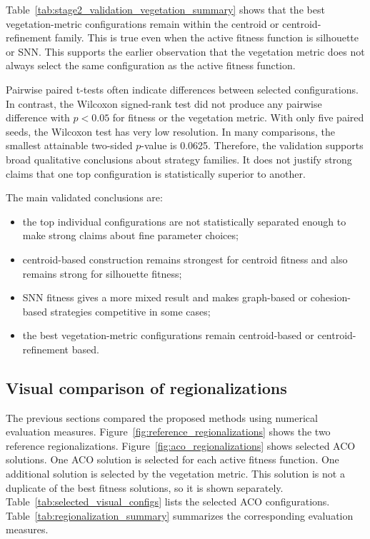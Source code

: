 \documentclass[11pt]{article}
\begin{document}
Table~\ref{tab:stage2_validation_vegetation_summary} shows that the best vegetation-metric configurations remain within the centroid or centroid-refinement family. This is true even when the active fitness function is silhouette or SNN. This supports the earlier observation that the vegetation metric does not always select the same configuration as the active fitness function.

Pairwise paired t-tests often indicate differences between selected configurations. In contrast, the Wilcoxon signed-rank test did not produce any pairwise difference with $p<0.05$ for fitness or the vegetation metric. With only five paired seeds, the Wilcoxon test has very low resolution. In many comparisons, the smallest attainable two-sided $p$-value is 0.0625. Therefore, the validation supports broad qualitative conclusions about strategy families. It does not justify strong claims that one top configuration is statistically superior to another.

The main validated conclusions are:
\begin{itemize}
  \item the top individual configurations are not statistically separated enough to make strong claims about fine parameter choices;
  \item centroid-based construction remains strongest for centroid fitness and also remains strong for silhouette fitness;
  \item SNN fitness gives a more mixed result and makes graph-based or cohesion-based strategies competitive in some cases;
  \item the best vegetation-metric configurations remain centroid-based or centroid-refinement based.
\end{itemize}


\subsection{Visual comparison of regionalizations}

The previous sections compared the proposed methods using numerical evaluation measures. Figure~\ref{fig:reference_regionalizations} shows the two reference regionalizations. Figure~\ref{fig:aco_regionalizations} shows selected ACO solutions. One ACO solution is selected for each active fitness function. One additional solution is selected by the vegetation metric. This solution is not a duplicate of the best fitness solutions, so it is shown separately. Table~\ref{tab:selected_visual_configs} lists the selected ACO configurations. Table~\ref{tab:regionalization_summary} summarizes the corresponding evaluation measures.
\end{document}
